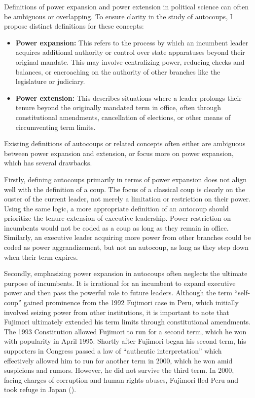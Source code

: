 \documentclass[
  12pt,
]{report}
\begin{document}
Definitions of power expansion and power extension in political science
can often be ambiguous or overlapping. To ensure clarity in the study of
autocoups, I propose distinct definitions for these concepts:

\begin{itemize}
\item
  \textbf{Power expansion:} This refers to the process by which an
  incumbent leader acquires additional authority or control over state
  apparatuses beyond their original mandate. This may involve
  centralizing power, reducing checks and balances, or encroaching on
  the authority of other branches like the legislature or judiciary.
\item
  \textbf{Power extension:} This describes situations where a leader
  prolongs their tenure beyond the originally mandated term in office,
  often through constitutional amendments, cancellation of elections, or
  other means of circumventing term limits.
\end{itemize}

Existing definitions of autocoups or related concepts often either are
ambiguous between power expansion and extension, or focus more on power
expansion, which has several drawbacks.

Firstly, defining autocoups primarily in terms of power expansion does
not align well with the definition of a coup. The focus of a classical
coup is clearly on the ouster of the current leader, not merely a
limitation or restriction on their power. Using the same logic, a more
appropriate definition of an autocoup should prioritize the tenure
extension of executive leadership. Power restriction on incumbents would
not be coded as a coup as long as they remain in office. Similarly, an
executive leader acquiring more power from other branches could be coded
as power aggrandizement, but not an autocoup, as long as they step down
when their term expires.

Secondly, emphasizing power expansion in autocoups often neglects the
ultimate purpose of incumbents. It is irrational for an incumbent to
expand executive power and then pass the powerful role to future
leaders. Although the term ``self-coup'' gained prominence from the 1992
Fujimori case in Peru, which initially involved seizing power from other
institutions, it is important to note that Fujimori ultimately extended
his term limits through constitutional amendments. The 1993 Constitution
allowed Fujimori to run for a second term, which he won with popularity
in April 1995. Shortly after Fujimori began his second term, his
supporters in Congress passed a law of ``authentic interpretation''
which effectively allowed him to run for another term in 2000, which he
won amid suspicions and rumors. However, he did not survive the third
term. In 2000, facing charges of corruption and human rights abuses,
Fujimori fled Peru and took refuge in Japan
().
\end{document}

